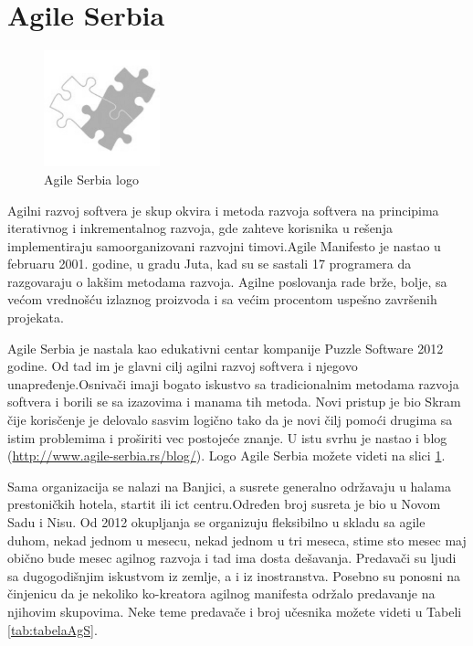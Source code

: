 \documentclass[a4paper]{article}
\begin{document}
{\section{Agile Serbia}
\label{sec:agsrb}

\begin{figure}[h]
  \centering
  \includegraphics[width=0.3\textwidth]{agile_srb.png}
  \caption{Agile Serbia logo}
  \label{fig:agslogo}
\end{figure}

Agilni razvoj softvera je skup okvira i metoda razvoja softvera na principima iterativnog i inkrementalnog razvoja, gde zahteve korisnika u rešenja implementiraju samoorganizovani razvojni timovi.Agile Manifesto je nastao u februaru 2001. godine, u gradu Juta, kad su se sastali 17 programera da razgovaraju o lakšim metodama razvoja. Agilne poslovanja rade brže, bolje, sa većom vrednošću izlaznog proizvoda i sa većim procentom uspešno završenih projekata.

Agile Serbia je nastala kao edukativni centar kompanije Puzzle Software 2012 godine. Od tad im je glavni cilj agilni razvoj softvera i njegovo unapređenje.Osnivači imaji bogato iskustvo sa tradicionalnim metodama razvoja softvera i borili se sa izazovima i manama tih metoda. Novi pristup je bio Skram čije korisčenje je delovalo sasvim logično tako da je novi čilj pomoći drugima sa istim problemima i proširiti vec postojeće znanje. U istu svrhu je nastao i blog (\url{http://www.agile-serbia.rs/blog/}). Logo Agile Serbia možete videti na slici \ref{fig:agslogo}.

Sama organizacija se nalazi na Banjici, a susrete generalno održavaju u halama prestoničkih hotela, startit ili ict centru.Određen broj susreta je bio u Novom Sadu i Nisu. Od 2012 okupljanja se organizuju fleksibilno u skladu sa agile duhom, nekad jednom u mesecu, nekad jednom u tri meseca, stime sto mesec maj obično bude mesec agilnog razvoja i tad ima dosta dešavanja. Predavači su ljudi sa dugogodišnjim iskustvom iz zemlje, a i iz inostranstva. Posebno su ponosni na činjenicu da je nekoliko ko-kreatora agilnog manifesta održalo predavanje na njihovim skupovima. Neke teme predavače i broj učesnika možete videti u Tabeli \ref{tab:tabelaAgS}.

}
\end{document}
